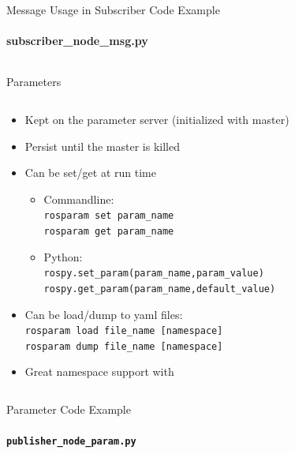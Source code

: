 \documentclass[aspectratio=43]{beamer}
\newcommand{\pyinline}[1]{\texttt{#1}}
\newcommand{\inline}[1]{\texttt{#1}}
\begin{document}
\begin{frame}{Message Usage in Subscriber Code Example}
	\framesubtitle{subscriber\_node\_msg.py}
	\inputminted{python}{snippet/subscriber_node_msg.py}
\end{frame}

\begin{frame}{Parameters}
	\begin{columns}
		\begin{column}{1.0\textwidth}
			\begin{itemize}
				\item Kept on the parameter server (initialized with master)
				\item Persist until the master is killed
				\item Can be set/get at run time
					\begin{itemize}
						\item Commandline:\\\inline{rosparam set param_name}\\\inline{rosparam get param_name}
						\item Python:\\\pyinline{rospy.set_param(param_name,param_value)}\\\pyinline{rospy.get_param(param_name,default_value)}
					\end{itemize}
				\item Can be load/dump to yaml files:\\\inline{rosparam load file_name [namespace]}\\\inline{rosparam dump file_name [namespace]}
				\item Great namespace support with \inline{~}
			\end{itemize}
		\end{column}
	\end{columns}
\end{frame}

\begin{frame}{Parameter Code Example}
	\framesubtitle{\texttt{publisher\_node\_param.py}}
	\inputminted{python}{snippet/publisher_node_param.py}
\end{frame}
\end{document}
